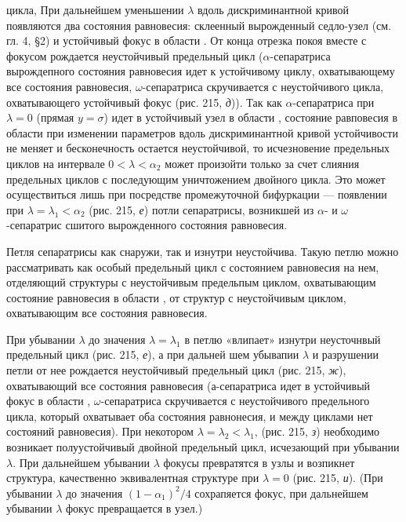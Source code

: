 \documentclass{article}
\newcommand{\RomanNumeralCaps}[1]
    {\MakeUppercase{\romannumeral #1}}
\begin{document}
цикла, При дальнейшем уменьшении $\lambda$ вдоль дискриминантной
кривой появляются два состояния равновесия: склеенный вырожденный 
седло-узел (см. гл. 4, \S 2) и устойчивый фокус в области
\RomanNumeralCaps{3}. От конца отрезка покоя вместе с фокусом рождается неустойчивый 
предельный цикл ($\alpha$-сепаратриса вырождепного состояния 
равновесия идет к устойчивому циклу, охватывающему
все состояния равновесия, $\omega$-сепаратриса скручивается с неустойчивого 
цикла, охватывающего устойчивый фокус (рис. 215, \textit{д})).
Так как $\alpha$-сепаратриса при $\lambda = 0$ (прямая $y = \sigma$) идет в устойчивый 
узел в области \RomanNumeralCaps{3}, состояние равповесия в области \RomanNumeralCaps{3} при
изменении параметров вдоль дискриминантной кривой устойчивости 
не меняет и бесконечность остается неустойчивой, то исчезновение 
предельных циклов на интервале $0 < \lambda < \alpha_{2}$ может
произойти только за счет слияния предельных циклов с последующим 
уничтожением двойного цикла. Это может осуществиться 
лишь при посредстве промежуточной бифуркации — появлении
при $\lambda = \lambda_{1} < \alpha_{2}$ (рис. 215, \textit{е}) потли сепаратрисы, возникшей из
$\alpha$- и $\omega$-сепаратрис сшитого вырожденного состояния равновесия.

Петля сепаратрисы как снаружи, так и изнутри неустойчива.
Такую петлю можно рассматривать как особый предельный цикл
с состоянием равновесия на нем, отделяющий структуры с неустойчивым 
предельпым циклом, охватывающим состояние равновесия 
в области \RomanNumeralCaps{3}, от структур с неустойчивым циклом, охватывающим 
все состояния равновесия.

При убывании $\lambda$ до значения $\lambda = \lambda_{1}$ в петлю «влипает» изнутри 
неусточнвый предельный цикл (рис. 215, \textit{е}), а при дальней
шем убывапии $\lambda$ и разрушении петли от нее рождается неустойчивый 
предельный цикл (рис. 215, \textit{ж}), охватывающий все состояния 
равновесия (а-сепаратриса идет в устойчивый фокус в области 
\RomanNumeralCaps{3}, $\omega$-сепаратриса скручивается с неустойчивого предельного
цикла, который охватывает оба состояния равнонесия, и между
циклами нет состояний равновесия). При некотором $\lambda = \lambda_{2} < \lambda_{1}$,
(рис. 215, \textit{з}) необходимо возникает полуустойчивый двойной предельный 
цикл, исчезающий при убывании $\lambda$. При дальнейшем
убывании $\lambda$ фокусы превратятся в узлы и возпикнет структура,
качественно эквивалентная структуре при $\lambda = 0$ (рис. 215, \textit{и}).
(При убывании $\lambda$ до значения $(1 - \alpha_{1})^2 / 4$ сохрапяется фокус, при
дальнейшем убывании $\lambda$ фокус превращается в узел.)
\end{document}
